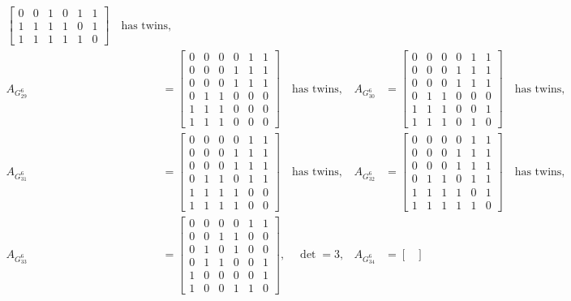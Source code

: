 \documentclass[11pt,reqno]{amsart}
\begin{document}
\begin{align*}
\begin{bmatrix}
0&0&1&0&1&1\\
1&1&1&1&0&1\\
1&1&1&1&1&0
\end{bmatrix}\quad\text{has twins},
\\
A_{\scriptscriptstyle G_{29}^6}&=\begin{bmatrix}
0&0&0&0&1&1\\
0&0&0&1&1&1\\
0&0&0&1&1&1\\
0&1&1&0&0&0\\
1&1&1&0&0&0\\
1&1&1&0&0&0
\end{bmatrix}\quad\text{has twins},
&A_{\scriptscriptstyle G_{30}^6}&=\begin{bmatrix}
0&0&0&0&1&1\\
0&0&0&1&1&1\\
0&0&0&1&1&1\\
0&1&1&0&0&0\\
1&1&1&0&0&1\\
1&1&1&0&1&0
\end{bmatrix}\quad\text{has twins},
\\
A_{\scriptscriptstyle G_{31}^6}&=\begin{bmatrix}
0&0&0&0&1&1\\
0&0&0&1&1&1\\
0&0&0&1&1&1\\
0&1&1&0&1&1\\
1&1&1&1&0&0\\
1&1&1&1&0&0
\end{bmatrix}\quad\text{has twins},
&A_{\scriptscriptstyle G_{32}^6}&=\begin{bmatrix}
0&0&0&0&1&1\\
0&0&0&1&1&1\\
0&0&0&1&1&1\\
0&1&1&0&1&1\\
1&1&1&1&0&1\\
1&1&1&1&1&0
\end{bmatrix}\quad\text{has twins},
\\
A_{\scriptscriptstyle G_{33}^6}&=\begin{bmatrix}
0&0&0&0&1&1\\
0&0&1&1&0&0\\
0&1&0&1&0&0\\
0&1&1&0&0&1\\
1&0&0&0&0&1\\
1&0&0&1&1&0
\end{bmatrix},\quad\det=3,
&A_{\scriptscriptstyle G_{34}^6}&=\begin{bmatrix}

\end{bmatrix}
\end{align*}
\end{document}
